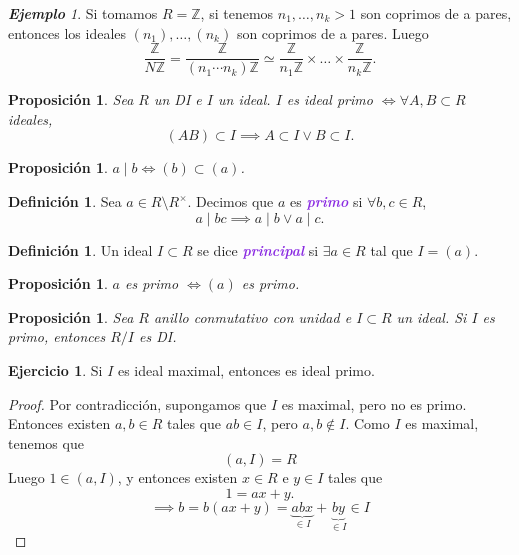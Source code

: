 \documentclass{article}
\newtheorem{proposition}[theorem]{Proposición}
\theoremstyle{definition}
\newtheorem{definition}[theorem]{Definición}
\newtheorem{exercise}{Ejercicio}
\theoremstyle{remark}
\newtheorem{example}[theorem]{\textbf{Ejemplo}}
\numberwithin{equation}{section}
\newcommand{\Z}{\mathbb{Z}}
\newcommand{\znz}[1]{\frac{\Z}{#1 \Z}}
\newcommand{\ubset}{\subset}
\newcommand{\wea}[1]{\textcolor{BlueViolet}{\textbf{\emph{#1}}}}
\begin{document}
\begin{example}
  Si tomamos $R = \Z$, si tenemos $n_1,\dots,n_k > 1$ son coprimos de a pares, entonces los ideales $(n_1), \dots, (n_k)$ son coprimos de a pares. Luego 
  \[ \znz N = \znz{(n_1 \cdots n_k)} \simeq \znz{n_1} \times \dots \times \znz{n_k}. \]
\end{example}

\begin{proposition}
  Sea $R$ un DI e $I$ un ideal. $I$ es ideal primo $\iff \forall A,B \subset R$ ideales, $$(AB) \subset I \implies A \subset I \lor B \subset I.$$
\end{proposition}

\begin{proposition}
  $a \mid b \iff (b) \subset (a)$.
\end{proposition}

\begin{definition}
  Sea $a \in R \setminus R^\times$. Decimos que $a$ es \wea{primo} si $\forall b,c \in R$, $$a \mid bc \implies a \mid b \lor a \mid c.$$
\end{definition}

\begin{definition}
  Un ideal $I \subset R$ se dice \wea{principal} si $\exists a \in R$ tal que $I = (a)$.
\end{definition}

\begin{proposition}
  $a$ es primo $\iff (a)$ es primo.
\end{proposition} %

\begin{proposition}
  Sea $R$ anillo conmutativo con unidad e $I \ubset R$ un ideal. Si $I$ es primo, entonces $R/I$ es DI.
\end{proposition}

\newpage %
\begin{exercise}
  Si $I$ es ideal maximal, entonces es ideal primo.
\end{exercise}
\begin{proof}
  Por contradicción, supongamos que $I$ es maximal, pero no es primo. Entonces existen $a,b \in R$ tales que $ab \in I$, pero $a,b \notin I$. Como $I$ es maximal, tenemos que 
  \[ (a,I) = R \]
  Luego $1 \in (a,I)$, y entonces existen $x \in R$ e $y \in I$ tales que 
  \[ 1 = ax + y. \]
  \[ \implies b = b (ax + y) = \underbrace{abx}_{\in I} + \underbrace{by}_{\in I} \in I \]
\end{proof}
\end{document}
